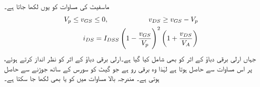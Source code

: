 ماسفیٹ کی مساوات  کو یوں لکھا جاتا ہے۔
\begin{gather}
\begin{aligned} \label{مساوات_منفی_فیٹ_افزائندہ}
V_p \le v_{GS} \le 0, \hspace{2 cm} v_{DS} \ge v_{GS}-V_p\\
i_{DS}=I_{DSS} \left(1-\frac{v_{GS}}{V_p} \right)^2 \left(1+\frac{v_{DS}}{V_A} \right)
\end{aligned}
\end{gather}
جہاں ارلی برقی دباؤ  کے اثر کو بھی شامل کیا گیا ہے۔ارلی برقی دباؤ کے اثر کو نظر انداز کرتے ہوئے،  پر اس مساوات سے  حاصل ہوتا ہے لہٰذا  وہ برقی رو ہے جو گیٹ کو سورس کے ساتھ جوڑنے سے حاصل ہوتی ہے۔ مندرجہ بالا مساوات میں   کو  یا  بھی لکھا جا سکتا ہے۔

